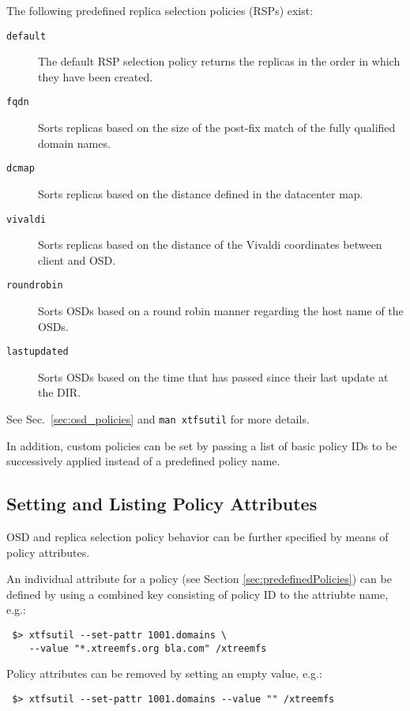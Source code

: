 \documentclass[a4paper,10pt]{book}
\begin{document}
The following predefined replica selection policies (RSPs) exist:

\begin{description}
 \item[\texttt{default}] The default RSP selection policy returns the replicas in the order in which they have been created.
 \item[\texttt{fqdn}] Sorts replicas based on the size of the post-fix match of the fully qualified domain names.
 \item[\texttt{dcmap}] Sorts replicas based on the distance defined in the datacenter map.
 \item[\texttt{vivaldi}] Sorts replicas based on the distance of the Vivaldi coordinates between client and OSD.
 \item[\texttt{roundrobin}] Sorts OSDs based on a round robin manner regarding the host name of the OSDs.
 \item[\texttt{lastupdated}] Sorts OSDs based on the time that has passed since their last update at the DIR.
\end{description}

See Sec.\ \ref{sec:osd_policies} and \texttt{man xtfsutil} for more details.

In addition, custom policies can be set by passing a list of basic policy IDs to be successively applied instead of a predefined policy name.


\subsection{Setting and Listing Policy Attributes}
\label{sec:policyAttributes}

OSD and replica selection policy behavior can be further specified by means of policy attributes.

An individual attribute for a policy (see Section \ref{sec:predefinedPolicies}) can be defined by using a combined key consisting of policy ID to the attriubte name, e.g.:

\begin{verbatim}
 $> xtfsutil --set-pattr 1001.domains \
    --value "*.xtreemfs.org bla.com" /xtreemfs
\end{verbatim}

Policy attributes can be removed by setting an empty value, e.g.:

\begin{verbatim}
 $> xtfsutil --set-pattr 1001.domains --value "" /xtreemfs
\end{verbatim}
\end{document}
